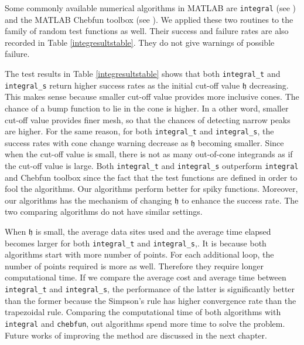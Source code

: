 \documentclass{iitthesis}
\theoremstyle{definition}
\theoremstyle{remark}
\begin{document}
Some commonly available numerical algorithms in MATLAB are {\tt integral} (see \cite{MAT9.3}) and the MATLAB Chebfun toolbox (see \cite{TrefEtal12}). We applied these two routines to the family of random test functions as well. Their success and failure rates are also recorded in Table \ref{integresultstable}. They do not give warnings of possible failure.

The test results in Table \ref{integresultstable} shows that both {\tt integral\_t} and {\tt integral\_s} return higher success rates as the initial cut-off value $\mathfrak{h}$ decreasing. This makes sense because smaller cut-off value provides more inclusive cones. The chance of a bump function to lie in the cone is higher. In a other word, smaller cut-off value provides finer mesh, so that the chances of detecting narrow peaks are higher. For the same reason, for both {\tt integral\_t} and {\tt integral\_s}, the success rates with cone change warning decrease as $\mathfrak{h}$ becoming smaller. Since when the cut-off value is small, there is not as many out-of-cone integrands as if the cut-off value is large. Both {\tt integral\_t} and {\tt integral\_s} outperform {\tt integral} and Chebfun toolbox since the fact that the test functions are defined in order to fool the algorithms. Our algorithms perform better for spiky functions. Moreover, our algorithms has the mechanism of changing $\mathfrak{h}$ to enhance the success rate. The two comparing algorithms do not have similar settings.

When $\mathfrak{h}$ is small, the average data sites used and the average time elapsed becomes larger for both {\tt integral\_t} and {\tt integral\_s},. It is because both algorithms start with more number of points. For each additional loop, the number of points required is more as well. Therefore they require longer computational time. If we compare the average cost and average time between {\tt integral\_t} and {\tt integral\_s}, the performance of the latter is significantly better than the former because the Simpson's rule has higher convergence rate than the trapezoidal rule. Comparing the computational time of both algorithms with {\tt integral} and {\tt chebfun}, out algorithms spend more time to solve the problem. Future works of improving the method are discussed in the next chapter.
\end{document}
